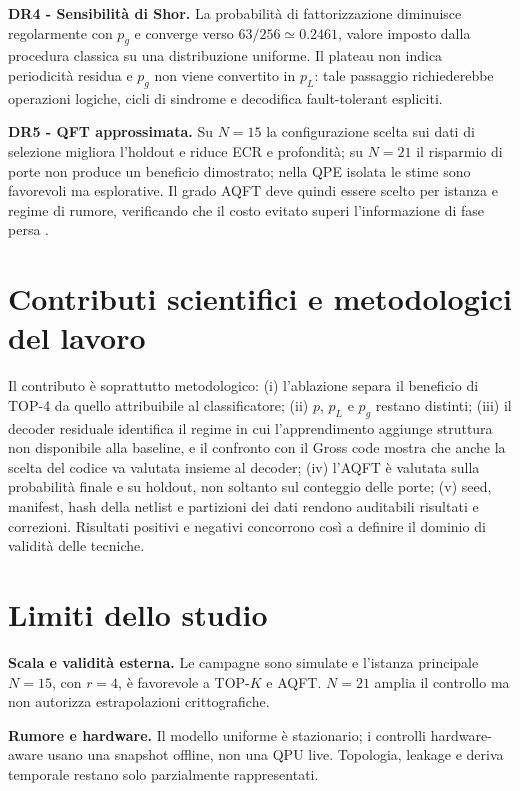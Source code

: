 \label{sec:finale_6_1_4}
\textbf{DR4 - Sensibilità di Shor.}
La probabilità di fattorizzazione diminuisce regolarmente con $p_g$ e converge verso $63/256\simeq0.2461$, valore imposto dalla procedura classica su una distribuzione uniforme. Il plateau non indica periodicità residua e $p_g$ non viene convertito in $p_L$: tale passaggio richiederebbe operazioni logiche, cicli di sindrome e decodifica fault-tolerant espliciti.

\label{sec:finale_6_1_5}
\textbf{DR5 - QFT approssimata.}
Su $N=15$ la configurazione scelta sui dati di selezione migliora l'holdout e riduce ECR e profondità; su $N=21$ il risparmio di porte non produce un beneficio dimostrato; nella QPE isolata le stime sono favorevoli ma esplorative. Il grado AQFT deve quindi essere scelto per istanza e regime di rumore, verificando che il costo evitato superi l'informazione di fase persa \cite{barencoAQFT1996,akoramurthy2026}.

\section{Contributi scientifici e metodologici del lavoro}\label{sec:finale_6_2}

Il contributo è soprattutto metodologico: (i) l'ablazione separa il beneficio di TOP-4 da quello attribuibile al classificatore; (ii) $p$, $p_L$ e $p_g$ restano distinti; (iii) il decoder residuale identifica il regime in cui l'apprendimento aggiunge struttura non disponibile alla baseline, e il confronto con il Gross code mostra che anche la scelta del codice va valutata insieme al decoder; (iv) l'AQFT è valutata sulla probabilità finale e su holdout, non soltanto sul conteggio delle porte; (v) seed, manifest, hash della netlist e partizioni dei dati rendono auditabili risultati e correzioni. Risultati positivi e negativi concorrono così a definire il dominio di validità delle tecniche.

\section{Limiti dello studio}\label{sec:finale_6_3}

\label{sec:finale_6_3_1}
\textbf{Scala e validità esterna.} Le campagne sono simulate e l'istanza principale $N=15$, con $r=4$, è favorevole a TOP-$K$ e AQFT. $N=21$ amplia il controllo ma non autorizza estrapolazioni crittografiche.

\label{sec:finale_6_3_2}
\textbf{Rumore e hardware.} Il modello uniforme è stazionario; i controlli hardware-aware usano una snapshot offline, non una QPU live. Topologia, leakage e deriva temporale restano solo parzialmente rappresentati.

